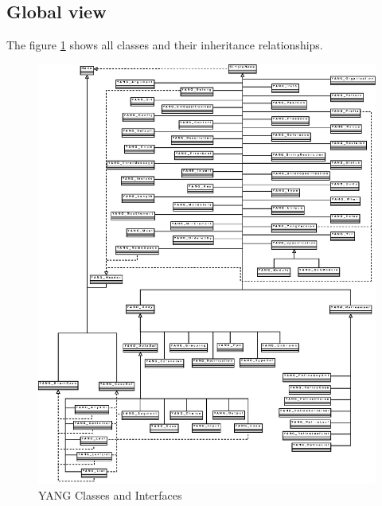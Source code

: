 \documentclass[a4paper]{article}
\begin{document}
\subsection{Global view}

The  figure  \ref{global}  shows  all classes  and  their  inheritance
relationships.

\begin{figure}[htbp]
\begin{center}
\includegraphics[scale = 1]{SimpleNodeHierarchy.eps}
\end{center}
\caption{YANG Classes and Interfaces}
\label{global}
\end{figure}




\end{document}
